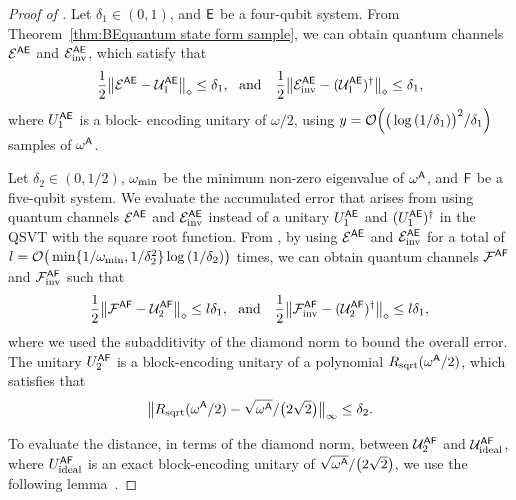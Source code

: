 \begin{proof}[Proof of ]


Let $\delta_1 \in (0, 1)$, and ${\mathsf{E}}$ be a four-qubit system.
From Theorem~\ref{thm:BEquantum state form sample}, we can obtain quantum channels ${\mathcal{E}}^{{\mathsf{A}}{\mathsf{E}}}$ and ${\mathcal{E}}_{\rm inv}^{{\mathsf{A}}{\mathsf{E}}}$, which satisfy that
\begin{align}
    \f{1}{2}\big\|\cE^{\sA\sE} - \cU_1^{\sA\sE}\big\|_\diamond \leq \delta_1, \ \ \text{and} \ \ \ 
    \f{1}{2}\big\|\cE_{\rm inv}^{\sA\sE} - (\cU_1^{\sA\sE})^\dag\big\|_\diamond \leq \delta_1,
\end{align}
where $U_1^{{\mathsf{A}}{\mathsf{E}}}$ is a block- encoding unitary of $\omega/2$, using $y = {\mathcal{O}}\Big(\big(\log{(1/\delta_1)}\big)^2/\delta_1\Big)$ samples of $\omega^{\mathsf{A}}$.


Let $\delta_2 \in (0, 1/2)$, $\omega_{\rm min}$ be the minimum non-zero eigenvalue of $\omega^{\mathsf{A}}$, and ${\mathsf{F}}$ be a five-qubit system. 
We evaluate the accumulated error that arises from using quantum channels ${\mathcal{E}}^{{\mathsf{A}}{\mathsf{E}}}$ and ${\mathcal{E}}_{\rm inv}^{{\mathsf{A}}{\mathsf{E}}}$ instead of a unitary $U_1^{{\mathsf{A}}{\mathsf{E}}}$ and $(U_1^{{\mathsf{A}}{\mathsf{E}}})^\dag$ in the QSVT with the square root function.
From \Cref{prop:QSVT sqrt}, by using ${\mathcal{E}}^{{\mathsf{A}}{\mathsf{E}}}$ and ${\mathcal{E}}_{\rm inv}^{{\mathsf{A}}{\mathsf{E}}}$ for a total of $l = {\mathcal{O}}\big(\min\{1/\omega_{\rm min}, 1/\delta_2^2\}\log{(1/\delta_2)}\big)$ times, we can obtain quantum channels ${\mathcal{F}}^{{\mathsf{A}}{\mathsf{F}}}$ and ${\mathcal{F}}_{\rm inv}^{{\mathsf{A}}{\mathsf{F}}}$ such that 
\begin{align}
\label{inteq:93}
    \frac{1}{2}\big\|{\mathcal{F}}^{{\mathsf{A}}{\mathsf{F}}} - {\mathcal{U}}_2^{{\mathsf{A}}{\mathsf{F}}}\big\|_\diamond \leq l\delta_1, \ \  \text{and} \ \ \
    \frac{1}{2}\big\|{\mathcal{F}}_{\rm inv}^{{\mathsf{A}}{\mathsf{F}}} - ({\mathcal{U}}_2^{{\mathsf{A}}{\mathsf{F}}})^\dag\big\|_\diamond \leq l\delta_1,
\end{align}
where we used the subadditivity of the diamond norm to bound the overall error.
The unitary $U_2^{{\mathsf{A}}{\mathsf{F}}}$ is a block-encoding unitary of a polynomial $R_{\rm sqrt}(\omega^{\mathsf{A}}/2)$, which satisfies that 
\begin{align}
    \big\|R_{\rm sqrt}(\omega^{\mathsf{A}}/2) - \sqrt{\omega^{\mathsf{A}}}/\big(2\sqrt{2}\big)\big\|_\infty \leq \delta_2.
\end{align}


To evaluate the distance, in terms of the diamond norm, between ${\mathcal{U}}_2^{{\mathsf{A}}{\mathsf{F}}}$ and ${\mathcal{U}}_{\rm ideal}^{{\mathsf{A}}{\mathsf{F}}}$, where $U_{\rm ideal}^{{\mathsf{A}}{\mathsf{F}}}$ is an exact block-encoding unitary of $\sqrt{\omega^{\mathsf{A}}}/\big(2\sqrt{2}\big)$, we use the following lemma~\cite{Gilyn2019thesis, gilyen2022improvedfidelity, wang2023SampletoQuary}.


\end{proof}
